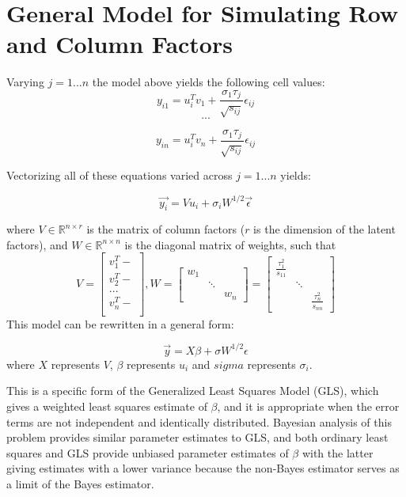 \documentclass[12pt,twoside]{dukestatscithesis}
\theoremstyle{definition}
\theoremstyle{definition}
\theoremstyle{definition}
\theoremstyle{remark}
\begin{document}
\section{General Model for Simulating Row and Column
Factors}\label{general-model-for-simulating-row-and-column-factors}

Varying \(j = 1 ... n\) the model above yields the following cell
values:
\[y_{i1} = u_i^Tv_1 + \frac{\sigma_1 \tau_j}{\sqrt{s_{ij}}}\epsilon_{ij}\]
\[ ... \]

\[ y_{in} = u_i^Tv_n + \frac{\sigma_1 \tau_j}{\sqrt{s_{ij}}}\epsilon_{ij} \]

Vectorizing all of these equations varied across \(j = 1...n\) yields:

\[\vec{y_i} = Vu_i + \sigma_i W^{1/2}\vec{\epsilon}\]

where \(V \in \mathbb{R}^{n \times r}\) is the matrix of column factors
(\(r\) is the dimension of the latent factors), and
\(W \in \mathbb{R}^{n \times n}\) is the diagonal matrix of weights,
such that \[V =
  \begin{bmatrix}
    v_1^T- \\
    v_2^T- \\
    ... \\
    v_n^T- \\
  \end{bmatrix},
  W =
  \begin{bmatrix}
    w_{1} & & \\
    & \ddots & \\
    & & w_{n}
  \end{bmatrix} 
  = \begin{bmatrix}
    \frac{\tau_1^2}{s_{11}} & & \\
    & \ddots & \\
    & & \frac{\tau_n^2}{s_{nn}}
  \end{bmatrix}\]
This model can be rewritten in a general form:

\[\vec{y} = X\beta + \sigma W^{1/2}\epsilon\] where \(X\) represents
\(V\), \(\beta\) represents \(u_i\) and \(sigma\) represents
\(\sigma_i\).

This is a specific form of the Generalized Least Squares Model (GLS),
which gives a weighted least squares estimate of \(\beta\), and it is
appropriate when the error terms are not independent and identically
distributed. Bayesian analysis of this problem provides similar
parameter estimates to GLS, and both ordinary least squares and GLS
provide unbiased parameter estimates of \(\beta\) with the latter giving
estimates with a lower variance because the non-Bayes estimator serves
as a limit of the Bayes estimator.
\end{document}

